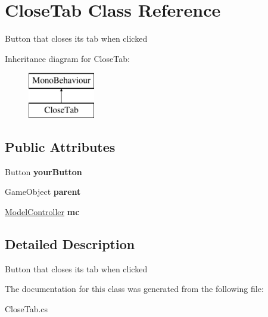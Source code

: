 \hypertarget{class_close_tab}{}\section{Close\+Tab Class Reference}
\label{class_close_tab}


Button that closes its tab when clicked  


Inheritance diagram for Close\+Tab\+:\begin{figure}[H]
\begin{center}
\leavevmode
\includegraphics[height=2.000000cm]{class_close_tab}
\end{center}
\end{figure}
\subsection*{Public Attributes}
\begin{DoxyCompactItemize}
\item 
\mbox{\label{class_close_tab_a99ebb029c1a1b54330d23663f4475ec1}} 
Button {\bfseries your\+Button}
\item 
\mbox{\label{class_close_tab_a24b8d522b292a5c726753d11973a7044}} 
Game\+Object {\bfseries parent}
\item 
\mbox{\label{class_close_tab_af479316a53d722614c1b31d0a9857ef7}} 
\hyperlink{class_model_controller}{Model\+Controller} {\bfseries mc}
\end{DoxyCompactItemize}


\subsection{Detailed Description}
Button that closes its tab when clicked 



The documentation for this class was generated from the following file\+:\begin{DoxyCompactItemize}
\item 
Close\+Tab.\+cs\end{DoxyCompactItemize}
